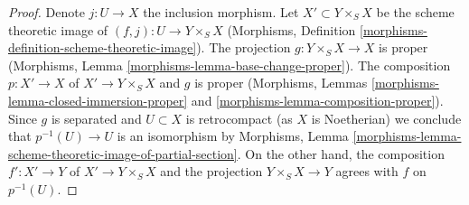 \begin{proof}
Denote $j : U \to X$ the inclusion morphism. Let $X' \subset Y \times_S X$
be the scheme theoretic image of $(f, j) : U \to Y \times_S X$
(Morphisms, Definition \ref{morphisms-definition-scheme-theoretic-image}).
The projection $g : Y \times_S X \to X$ is proper
(Morphisms, Lemma \ref{morphisms-lemma-base-change-proper}).
The composition $p : X' \to X$ of $X' \to Y \times_S X$ and $g$ is proper
(Morphisms, Lemmas \ref{morphisms-lemma-closed-immersion-proper} and
\ref{morphisms-lemma-composition-proper}).
Since $g$ is separated and $U \subset X$ is retrocompact (as $X$ is Noetherian)
we conclude that $p^{-1}(U) \to U$ is an isomorphism by
Morphisms, Lemma
\ref{morphisms-lemma-scheme-theoretic-image-of-partial-section}.
On the other hand, the composition $f' : X' \to Y$ of $X' \to Y \times_S X$
and the projection $Y \times_S X \to Y$ agrees with $f$ on $p^{-1}(U)$.
\end{proof}













